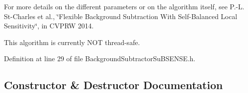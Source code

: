For more details on the different parameters or on the algorithm itself, see P.-\/L. St-\/\+Charles et al., \char`\"{}\+Flexible Background Subtraction With Self-\/\+Balanced Local Sensitivity\char`\"{}, in C\+V\+P\+RW 2014.

This algorithm is currently N\+OT thread-\/safe. 

Definition at line 29 of file Background\+Subtractor\+Su\+B\+S\+E\+N\+S\+E.\+h.



\subsection{Constructor \& Destructor Documentation}
\mbox{\label{class_background_subtractor_su_b_s_e_n_s_e_a0f3118adf0f3365a140390c6ad94e9df}} 
